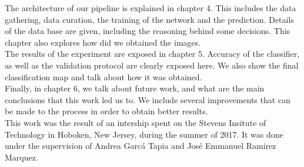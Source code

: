 The architecture of our pipeline is explained in chapter 4. This includes the data gathering, data curation, the training of the network and the prediction. Details of the data base are given, including the reasoning behind some decisions. This chapter also explores how did we obtained the images.\\

The results of the experiment are exposed in chapter 5. Accuracy of the classifier, as well as the validation protocol are clearly exposed here. We also show the final classification map and talk about how it was obtained.\\

Finally, in chapter 6, we talk about future work, and what are the main conclusions that this work led us to. We include several improvements that can be made to the process in order to obtain better results.\\

This work was the result of an intership spent on the Stevens Insitute of Technology in Hoboken, New Jersey, during the summer of 2017. It was done under the supervision of Andrea Garc\'a Tapia and Jos\'e Emmanuel Ramirez Marquez.\\